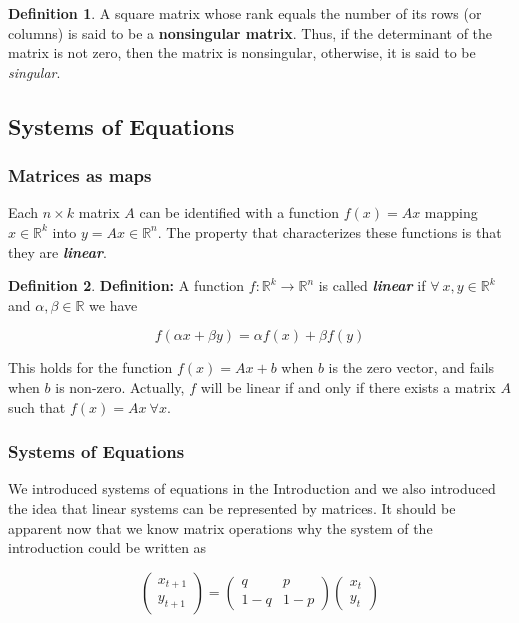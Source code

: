 \documentclass[a4paper,11pt]{article}
\theoremstyle{definition}
\newtheorem{definition}{Definition}
\theoremstyle{plain}
\begin{document}
\begin{definition}
A square matrix whose rank equals the number of its rows (or columns) is said to be a \textbf{nonsingular matrix}. Thus, if the determinant of the matrix is not zero, then the matrix is nonsingular, otherwise, it is said to be \emph{singular}.
\end{definition}

\subsection{Systems of Equations}\label{systems-of-equations}

\subsubsection{Matrices as maps}\label{matrices-as-maps}

Each \(n\times k\) matrix \(A\) can be identified with a function
\(f(x) = Ax\) mapping \(x\in\mathbb{R}^k\) into
\(y = Ax \in\mathbb{R}^n\). The property that characterizes these
functions is that they are \textbf{\emph{linear}}.

\begin{definition}
\textbf{Definition:} A function
\(f : \mathbb{R}^k \rightarrow \mathbb{R}^n\) is called
\textbf{\emph{linear}} if \(\forall \: x,y\in\mathbb{R}^k\) and
\(\alpha,\beta\in\mathbb{R}\) we have

\[
f(\alpha x + \beta y) = \alpha f(x) + \beta f(y)
\]
\end{definition}

This holds for the function \(f(x) = Ax + b\) when \(b\) is the zero
vector, and fails when \(b\) is non-zero. Actually, \(f\) will be linear
if and only if there exists a matrix \(A\) such that
\(f(x) = Ax \: \forall x\).

\subsubsection{Systems of Equations}\label{systems-of-equations-1}

We introduced systems of equations in the Introduction and we also
introduced the idea that linear systems can be represented by matrices.
It should be apparent now that we know matrix operations why the system
of the introduction could be written as

\[
\begin{pmatrix} x_{t+1} \\ y_{t+1} \end{pmatrix} = \begin{pmatrix} q & p \\ 1-q & 1-p \end{pmatrix}\begin{pmatrix} x_t \\ y_t \end{pmatrix}
\]
\end{document}
